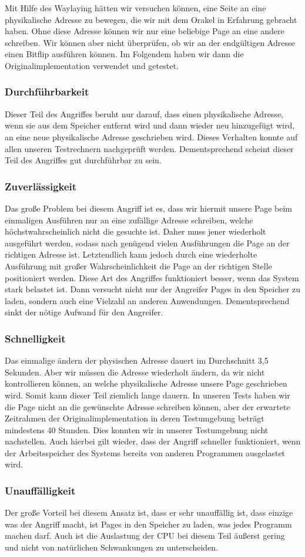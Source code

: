 Mit Hilfe des Waylaying hätten wir versuchen können, eine Seite an eine physikalische Adresse zu bewegen, die wir mit dem Orakel in Erfahrung gebracht haben. Ohne diese Adresse können wir nur eine beliebige Page an eine andere schreiben. Wir können aber nicht überprüfen, ob wir an der endgültigen Adresse einen Bitflip ausführen können. Im Folgendem haben wir dann die Originalimplementation \cite{git-rowhammer} verwendet und getestet.

\subsubsection{Durchführbarkeit}
Dieser Teil des Angriffes beruht nur darauf, dass einen physikalische Adresse, wenn sie aus dem Speicher entfernt wird und dann wieder neu hinzugefügt wird, an eine neue physikalische Adresse geschrieben wird. Dieses Verhalten konnte auf allen unseren Testrechnern nachgeprüft werden. Dementsprechend scheint dieser Teil des Angriffes gut durchführbar zu sein.
\subsubsection{Zuverlässigkeit}
Das große Problem bei diesem Angriff ist es, dass wir hiermit unsere Page beim einmaligen Ausführen nur an eine zufällige Adresse schreiben, welche höchstwahrscheinlich nicht die gesuchte ist. Daher muss jener wiederholt ausgeführt werden, sodass nach genügend vielen Ausführungen die Page an der richtigen Adresse ist. Letztendlich kann jedoch durch eine wiederholte Ausführung mit großer Wahrscheinlichkeit die Page an der richtigen Stelle positioniert werden.
Diese Art des Angriffes funktioniert besser, wenn das System stark belastet ist. Dann versucht nicht nur der Angreifer Pages in den Speicher zu laden, sondern auch eine Vielzahl an anderen Anwendungen. Dementsprechend sinkt der nötige Aufwand für den Angreifer.
\subsubsection{Schnelligkeit}
Das einmalige ändern der physischen Adresse dauert im Durchschnitt 3,5 Sekunden. Aber wir müssen die Adresse wiederholt ändern, da wir nicht kontrollieren können, an welche physikalische Adresse unsere Page geschrieben wird. Somit kann dieser Teil ziemlich lange dauern. In unseren Tests haben wir die Page nicht an die gewünschte Adresse schreiben können, aber der erwartete Zeitrahmen der Originalimplementation in deren Testumgebung beträgt mindestens 40 Stunden. Dies konnten wir in unserer Testumgebung nicht nachstellen. Auch hierbei gilt wieder, dass der Angriff schneller funktioniert, wenn der Arbeitsspeicher des Systems bereits von anderen Programmen ausgelastet wird.
\subsubsection{Unauffälligkeit}
Der große Vorteil bei diesem Ansatz ist, dass er sehr unauffällig ist, dass einzige was der Angriff macht, ist Pages in den Speicher zu laden, was jedes Programm machen darf. Auch ist die Auslastung der CPU bei diesem Teil äußerst gering und nicht von natürlichen Schwankungen zu unterscheiden.